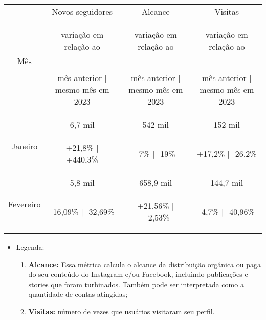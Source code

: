 \documentclass{article}%
\begin{document}
\begin{minipage}{\textwidth}%
\centering%
\begin{tabular}{@{}|c|c|c|c|@{}}%
\toprule%
\multirow{3}{*}{Mês}&Novos seguidores&Alcance&Visitas\\%
&\begin{footnotesize}%
variação em relação ao%
\end{footnotesize}&\begin{footnotesize}%
variação em relação ao%
\end{footnotesize}&\begin{footnotesize}%
variação em relação ao%
\end{footnotesize}\\%
&\begin{footnotesize}%
mês anterior | mesmo mês em 2023%
\end{footnotesize}&\begin{footnotesize}%
mês anterior | mesmo mês em 2023%
\end{footnotesize}&\begin{footnotesize}%
mês anterior | mesmo mês em 2023%
\end{footnotesize}\\%
\midrule%
\multirow{2}{*}{Janeiro}&6,7 mil&542 mil&152 mil\\%
&\begin{footnotesize}%
+21,8\% | +440,3\%%
\end{footnotesize}&\begin{footnotesize}%
{-}7\% | {-}19\%%
\end{footnotesize}&\begin{footnotesize}%
+17,2\% | {-}26,2\%%
\end{footnotesize}\\%
\midrule%
\multirow{2}{*}{Fevereiro}&5,8 mil&658,9 mil&144,7 mil\\%
&\begin{footnotesize}%
{-}16,09\% | {-}32,69\%%
\end{footnotesize}&\begin{footnotesize}%
+21,56\% | +2,53\%%
\end{footnotesize}&\begin{footnotesize}%
{-}4,7\% | {-}40,96\%%
\end{footnotesize}\\\bottomrule%
%
\end{tabular}%
\end{minipage}%
\begin{itemize}%
\item%
Legenda:%
\begin{enumerate}[label=-]%
\item%
\textbf{Alcance:} Essa métrica calcula o alcance da distribuição orgânica ou paga do seu conteúdo do Instagram e/ou Facebook, incluindo publicações e stories que foram turbinados. Também pode ser interpretada como a quantidade de contas atingidas;%
\item%
\textbf{Visitas:} número de vezes que usuários visitaram seu perfil.%
\end{enumerate}%
\end{itemize}
\end{document}
